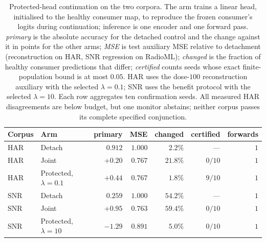 \begin{table}[htbp]
\centering
\caption{Protected-head continuation on the two corpora. The arm trains a linear head, initialised to the healthy consumer map, to reproduce the frozen consumer's logits during continuation; inference is one encoder and one forward pass. \emph{primary} is the absolute accuracy for the detached control and the change against it in points for the other arms; \emph{MSE} is test auxiliary MSE relative to detachment (reconstruction on HAR, SNR regression on RadioML); \emph{changed} is the fraction of healthy consumer predictions that differ; \emph{certified} counts seeds whose exact finite-population bound is at most $0.05$. HAR uses the dose-$100$ reconstruction auxiliary with the selected $\lambda=0.1$; SNR uses the benefit protocol with the selected $\lambda=10$. Each row aggregates ten confirmation seeds. All measured HAR disagreements are below budget, but one monitor abstains; neither corpus passes its complete specified conjunction.}
\label{tab:protected_head}
\footnotesize
\setlength{\tabcolsep}{3pt}
\begin{tabular}{llrrrrr}
\toprule
Corpus & Arm & primary & MSE & changed & certified & forwards \\
\midrule
HAR & Detach & $0.912$ & $1.000$ & $2.2\%$ & --- & $1$ \\
HAR & Joint & $+0.20$ & $0.767$ & $21.8\%$ & $0/10$ & $1$ \\
HAR & Protected, $\lambda=0.1$ & $+0.44$ & $0.767$ & $1.8\%$ & $9/10$ & $1$ \\
\midrule
SNR & Detach & $0.259$ & $1.000$ & $54.2\%$ & --- & $1$ \\
SNR & Joint & $+0.95$ & $0.763$ & $59.4\%$ & $0/10$ & $1$ \\
SNR & Protected, $\lambda=10$ & $-1.29$ & $0.891$ & $5.0\%$ & $0/10$ & $1$ \\
\bottomrule
\end{tabular}
\end{table}
